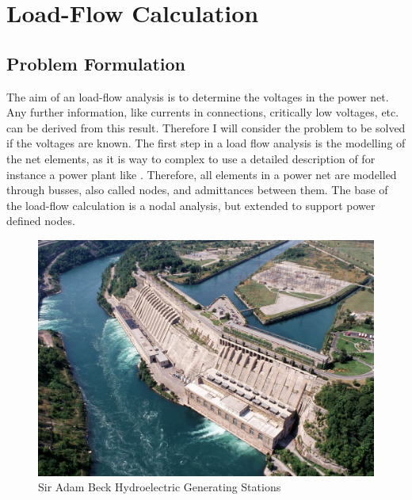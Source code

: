 \chapter{Load-Flow Calculation}

\section{Problem Formulation}
The aim of an load-flow analysis is to determine the voltages in the power net. Any further information, like currents in connections, critically low voltages, etc. can be derived from this result. Therefore I will consider the problem to be solved if the voltages are known.
The first step in a load flow analysis is the modelling of the net elements, as it is way to complex to use a detailed description of for instance a power plant like . Therefore, all elements in a power net are modelled through busses, also called nodes, and admittances between them. The base of the load-flow calculation is a nodal analysis, but extended to support power defined nodes.

\begin{figure}
	\includegraphics[width=\textwidth]{figures/adam_beck_complex.jpg}
	\caption{Sir Adam Beck Hydroelectric Generating Stations \cite{adam_back_complex}}
	\label{fig:power_plant}
\end{figure}


